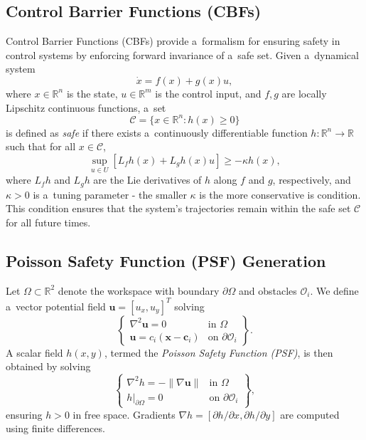 \documentclass[letterpaper, 10 pt, conference]{ieeeconf}
\begin{document}
\subsection{Control Barrier Functions (CBFs)}
Control Barrier Functions (CBFs) \cite{garg2023advancestheorycontrolbarrier} provide a~formalism for ensuring safety in
control systems by enforcing forward invariance of a~safe set. Given a~dynamical
system
\begin{equation}
    \dot{x} = f(x) + g(x)u,
\end{equation}
where $x\in\mathbb{R}^n$ is the state, $u\in\mathbb{R}^m$ is the control input, and
$f,g$ are locally Lipschitz continuous functions, a~set
\begin{equation}
    \mathcal{C} = \{x\in\mathbb{R}^n : h(x) \ge 0\}
\end{equation}
is defined as \emph{safe} if there exists a~continuously differentiable function
$h:\mathbb{R}^n \to \mathbb{R}$ such that for all $x\in\mathcal{C}$,
\begin{equation}
    \sup_{u\in U} [L_f h(x) + L_g h(x) u] \ge -\kappa h(x),
\end{equation}
where $L_f h$ and $L_g h$ are the Lie derivatives of $h$ along $f$ and $g$,
respectively, and $\kappa>0$ is a~tuning parameter - the smaller $\kappa$ is
the more conservative is condition. This condition ensures that the system's
trajectories remain within the safe set $\mathcal{C}$ for all future times.

\subsection{Poisson Safety Function (PSF) Generation}
Let $\Omega \subset \mathbb{R}^2$ denote the workspace with boundary
$\partial\Omega$ and obstacles $\mathcal{O}_i$. We define a~vector
potential field $\mathbf{u} = [u_x,u_y]^T$ solving
\begin{equation}
    \left\lbrace
    \begin{array}{ll}
        \nabla^2 \mathbf{u} = 0 & \text{in } \Omega \\
        \mathbf{u} = c_i (\mathbf{x}-\mathbf{c}_i) & \text{on } \partial \mathcal{O}_i
    \end{array}
    \right\rbrace
    .
\end{equation}
A scalar field $h(x,y)$, termed the \emph{Poisson Safety Function (PSF)},
is then obtained by solving
\begin{equation}
    \left\lbrace
    \begin{array}{ll}
        \nabla^2 h = -\|\nabla \mathbf{u}\| & \text{in } \Omega \\
        h|_{\partial\Omega}=0 & \text{on } \partial \mathcal{O}_i
    \end{array}
    \right\rbrace
    ,
\end{equation}
ensuring $h>0$ in free space. Gradients $\nabla h = [\partial h/\partial
x,\partial h/\partial y]$ are computed using finite differences.
\end{document}
